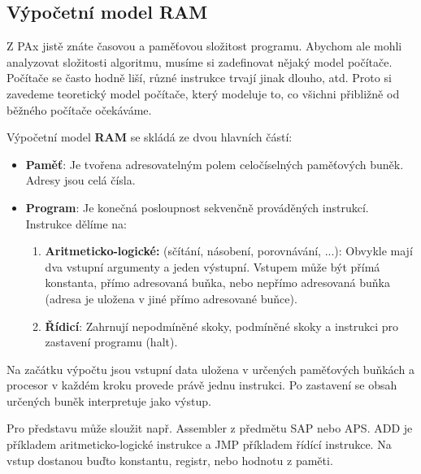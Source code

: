 \newpage

\subsection{Výpočetní model RAM}

Z PAx jistě znáte časovou a paměťovou složitost programu. Abychom ale mohli analyzovat složitosti algoritmu, musíme si zadefinovat nějaký model počítače. Počítače se často hodně liší, různé instrukce trvají jinak dlouho, atd. Proto si zavedeme teoretický model počítače, který modeluje to, co všichni přibližně od běžného počítače očekáváme.

\begin{definition}
Výpočetní model \textbf{RAM} se skládá ze dvou hlavních částí:
\begin{itemize}
    \item \textbf{Paměť}: Je tvořena adresovatelným polem celočíselných paměťových buněk. Adresy jsou celá čísla.
    \item \textbf{Program}: Je konečná posloupnost sekvenčně prováděných instrukcí. Instrukce dělíme na:
    \begin{enumerate}
        \item \textbf{Aritmeticko-logické:} (sčítání, násobení, porovnávání, ...): Obvykle mají dva vstupní argumenty a jeden výstupní. Vstupem může být přímá konstanta, přímo adresovaná buňka, nebo nepřímo adresovaná buňka (adresa je uložena v jiné přímo adresované buňce).
        \item \textbf{Řídicí}: Zahrnují nepodmíněné skoky, podmíněné skoky a instrukci pro zastavení programu (halt).
    \end{enumerate}
\end{itemize}
\end{definition} \medskip

\noindent Na začátku výpočtu jsou vstupní data uložena v určených paměťových buňkách a procesor v každém kroku provede právě jednu instrukci. Po zastavení se obsah určených buněk interpretuje jako výstup. 

\medskip

\begin{remark}
    Pro představu může sloužit např. Assembler z předmětu SAP nebo APS. ADD je příkladem aritmeticko-logické instrukce a JMP příkladem řídící instrukce. Na vstup dostanou buďto konstantu, registr, nebo hodnotu z paměti.
\end{remark}

